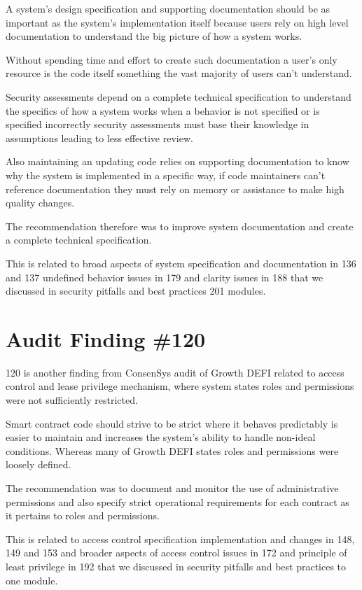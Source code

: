 A system's design specification and supporting documentation should be as important as the system's implementation itself because users rely on high level documentation to understand the big picture of how a system works. 

Without spending time and effort to create such documentation a user's only resource is the code itself something the vast majority of users can't understand. 

Security assessments depend on a complete technical specification to understand the specifics of how a system works when a behavior is not specified or is specified incorrectly security assessments must base their knowledge in assumptions leading to less effective review. 

Also maintaining an updating code relies on supporting documentation to know why the system is implemented in a specific way, if code maintainers can't reference documentation they must rely on memory or assistance to make high quality changes.

The recommendation therefore was to improve system documentation and create a complete technical specification.

This is related to broad aspects of system specification and documentation in 136 and 137 undefined behavior issues in 179 and clarity issues in 188 that we discussed in security pitfalls and best practices 201 modules.

\section{Audit Finding \#120}

120 is another finding from ConsenSys audit of Growth DEFI related to access control and lease privilege mechanism, where system states roles and permissions were not sufficiently restricted.

Smart contract code should strive to be strict where it behaves predictably is easier to maintain and increases the system's ability to handle non-ideal conditions. Whereas many of Growth DEFI states roles and permissions were loosely defined.

The recommendation was to document and monitor the use of administrative permissions and also specify strict operational requirements for each contract as it pertains to roles and permissions.

This is related to access control specification implementation and changes in 148, 149 and 153 and broader aspects of access control issues in 172 and principle of least privilege in 192 that we discussed in security pitfalls and best practices to one module.

